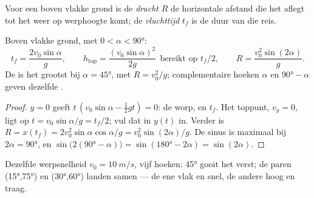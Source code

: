 \begin{definition}[Dracht]\label{def:g12:projectile-motion:range}
Voor een  boven vlakke grond is de \emph{dracht} $R$
de horizontale afstand die het aflegt tot het weer op werphoogte komt; de
\emph{vluchttijd} $t_f$ is de duur van die reis.
\end{definition}

\begin{proposition}\label{prop:g12:projectile-motion:range}
Boven vlakke grond, met $0 < \alpha < \ang{90}$:
\[
t_f = \frac{2 v_0 \sin\alpha}{g}, \qquad
h_{\text{top}} = \frac{(v_0\sin\alpha)^2}{2g}
\ \ \text{bereikt op } t_f/2, \qquad
R = \frac{v_0^2 \sin(2\alpha)}{g}.
\]
De  is het grootst bij $\alpha = \ang{45}$, met $R = v_0^2/g$;
complementaire hoeken $\alpha$ en $\ang{90} - \alpha$ geven dezelfde .
\end{proposition}

\begin{proof}
$y = 0$ geeft $t\,(v_0\sin\alpha - \tfrac12 gt) = 0$: de worp, en $t_f$. Het
toppunt, $v_y = 0$, ligt op $t = v_0\sin\alpha/g = t_f/2$; vul dat in
$y(t)$ in. Verder is $R = x(t_f) = 2v_0^2\sin\alpha\cos\alpha/g =
v_0^2\sin(2\alpha)/g$. De sinus is maximaal bij $2\alpha = \ang{90}$, en
$\sin\bigl(2(\ang{90}-\alpha)\bigr) = \sin(\ang{180} - 2\alpha) =
\sin(2\alpha)$.
\end{proof}

\begin{omfigure}

{\small Dezelfde werpsnelheid $v_0 = \qty{10}{m/s}$, vijf hoeken: \ang{45}
gooit het verst; de paren (\ang{15},\ang{75}) en (\ang{30},\ang{60}) landen
samen --- de ene vlak en snel, de andere hoog en traag.}
\end{omfigure}

